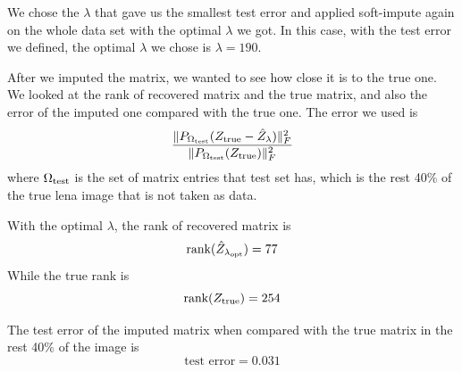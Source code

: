 \documentclass{article}
\begin{document}
	We chose the $\lambda$ that gave us the smallest test error and applied soft-impute again on the whole data set with the optimal $\lambda$ we got. In this case, with the test error we defined, the optimal $\lambda$ we chose is $\lambda = 190$. 

	After we imputed the matrix, we wanted to see how close it is to the true one. We looked at the rank of recovered matrix and the true matrix, and also the error of the imputed one compared with the true one. The error we used is 
	\begin{equation} \label{test_error}
	\frac{\|P_{\Omega_{\rm test}}(Z_{\rm true} - \hat{Z}_{\lambda})\|_{F}^2}{\|P_{\Omega_{\rm test}}(Z_{\rm true})\|_F^2} 
	\end{equation}
	where $\Omega_{\rm test}$ is the set of matrix entries that test set has, which is the rest 40\% of the true lena image that is not taken as data.

	With the optimal $\lambda$, the rank of recovered matrix is
	\[\textrm{rank} (\hat{Z}_{\lambda_{\rm opt}}) = 77\]
	While the true rank is
	\[\textrm{rank}(Z_{\rm true}) = 254\]

	The test error of the imputed matrix when compared with the true matrix in the rest 40\% of the image is  
	\[\textrm{test error} = 0.031\]
\end{document}
